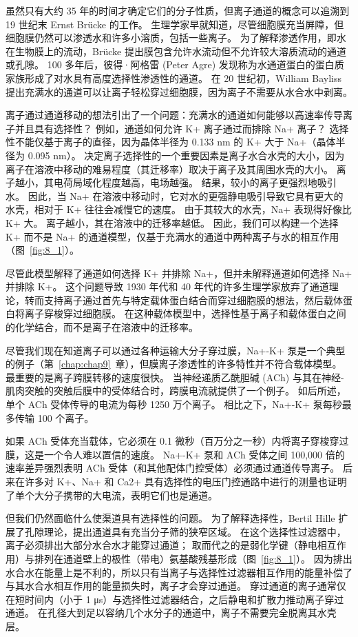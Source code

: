 虽然只有大约 35 年的时间才确定它们的分子性质，但离子通道的概念可以追溯到 19 世纪末 Ernst Brücke 的工作。
生理学家早就知道，尽管细胞膜充当屏障，但细胞膜仍然可以渗透水和许多小溶质，包括一些离子。
为了解释渗透作用，即水在生物膜上的流动，Brücke 提出膜包含允许水流动但不允许较大溶质流动的通道或孔隙。
100 多年后，彼得·阿格雷 (Peter Agre) 发现称为水通道蛋白的蛋白质家族形成了对水具有高度选择性渗透性的通道。
在 20 世纪初，William Bayliss 提出充满水的通道可以让离子轻松穿过细胞膜，因为离子不需要从水合水中剥离。


离子通过通道移动的想法引出了一个问题：充满水的通道如何能够以高速率传导离子并且具有选择性？
例如，通道如何允许 K+ 离子通过而排除 Na+ 离子？
选择性不能仅基于离子的直径，因为晶体半径为 0.133 nm 的 K+ 大于 Na+（晶体半径为 0.095 nm）。
决定离子选择性的一个重要因素是离子水合水壳的大小，因为离子在溶液中移动的难易程度（其迁移率）取决于离子及其周围水壳的大小。
离子越小，其电荷局域化程度越高，电场越强。
结果，较小的离子更强烈地吸引水。
因此，当 Na+ 在溶液中移动时，它对水的更强静电吸引导致它具有更大的水壳，相对于 K+ 往往会减慢它的速度。
由于其较大的水壳，Na+ 表现得好像比 K+ 大。
离子越小，其在溶液中的迁移率越低。
因此，我们可以构建一个选择 K+ 而不是 Na+ 的通道模型，仅基于充满水的通道中两种离子与水的相互作用（图~\ref{fig:8_1}）。


尽管此模型解释了通道如何选择 K+ 并排除 Na+，但并未解释通道如何选择 Na+ 并排除 K+。
这个问题导致 1930 年代和 40 年代的许多生理学家放弃了通道理论，转而支持离子通过首先与特定载体蛋白结合而穿过细胞膜的想法，然后载体蛋白将离子穿梭穿过细胞膜。
在这种载体模型中，选择性基于离子和载体蛋白之间的化学结合，而不是离子在溶液中的迁移率。


尽管我们现在知道离子可以通过各种运输大分子穿过膜，Na+-K+ 泵是一个典型的例子（第~\ref{chap:chap9}~章），但膜离子渗透性的许多特性并不符合载体模型。
最重要的是离子跨膜转移的速度很快。 
当神经递质乙酰胆碱 (ACh) 与其在神经-肌肉突触的突触后膜中的受体结合时，跨膜电流就提供了一个例子。
如后所述，单个 ACh 受体传导的电流为每秒 1250 万个离子。
相比之下，Na+-K+ 泵每秒最多传输 100 个离子。


如果 ACh 受体充当载体，它必须在 0.1 微秒（百万分之一秒）内将离子穿梭穿过膜，这是一个令人难以置信的速度。
Na+-K+ 泵和 ACh 受体之间 100,000 倍的速率差异强烈表明 ACh 受体（和其他配体门控受体）必须通过通道传导离子。
后来在许多对 K+、Na+ 和 Ca2+ 具有选择性的电压门控通路中进行的测量也证明了单个大分子携带的大电流，表明它们也是通道。

但我们仍然面临什么使渠道具有选择性的问题。
为了解释选择性，Bertil Hille 扩展了孔隙理论，提出通道具有充当分子筛的狭窄区域。
在这个选择性过滤器中，离子必须排出大部分水合水才能穿过通道；
取而代之的是弱化学键（静电相互作用）与排列在通道壁上的极性（带电）氨基酸残基形成（图~\ref{fig:8_1}）。
因为排出水合水在能量上是不利的，所以只有当离子与选择性过滤器相互作用的能量补偿了与其水合水相互作用的能量损失时，离子才会穿过通道。
穿过通道的离子通常仅在短时间内（小于 1 μs）与选择性过滤器结合，之后静电和扩散力推动离子穿过通道。
在孔径大到足以容纳几个水分子的通道中，离子不需要完全脱离其水壳层。


